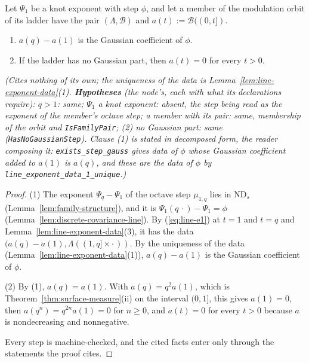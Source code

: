 \begin{lemma}
\label{lem:member-gaussian-part}
\leanok
{}
Let $\Psi_1$ be a knot exponent with step $\phi$, and let a member of the modulation orbit of its
ladder have the pair $(\Lambda, \mathcal{B})$ and $a(t) := \mathcal{B}((0,t])$.
\begin{enumerate}
\item $a(q) - a(1)$ is the Gaussian coefficient of $\phi$.
\item If the ladder has no Gaussian part, then $a(t) = 0$ for every $t > 0$.
\end{enumerate}
\statusT\quad\emph{(Cites nothing of its own; the uniqueness of the data is
Lemma~\ref{lem:line-exponent-data}(1). \textbf{Hypotheses} (the node's, each with what its
declarations require): $q > 1$: same; $\Psi_1$ a knot exponent: absent, the step being read as the
exponent of the member's octave step; a member with its pair: same, membership of the orbit and
\texttt{IsFamilyPair}; (2) no Gaussian part: same (\texttt{HasNoGaussianStep}). Clause (1) is
stated in decomposed form, the reader composing it: \texttt{exists\_step\_gauss} gives data of
$\phi$ whose Gaussian coefficient added to $a(1)$ is $a(q)$, and these are the data of $\phi$ by
\texttt{line\_exponent\_data\_1\_unique}.)}
\end{lemma}

\begin{proof}
\leanok
{}
(1) The exponent $\Psi_q - \Psi_1$ of the octave step $\mu_{1,q}$ lies in $\mathrm{ND}_s$
(Lemma~\ref{lem:family-structure}), and it is $\Psi_1(q\,\cdot) - \Psi_1 = \phi$
(Lemma~\ref{lem:discrete-covariance-line}). By (\ref{eq:line-e1}) at $t = 1$ and $t = q$ and
Lemma~\ref{lem:line-exponent-data}(3), it has the data $(a(q) - a(1), \Lambda((1,q] \times \cdot\,))$.
By the uniqueness of the data (Lemma~\ref{lem:line-exponent-data}(1)), $a(q) - a(1)$ is the
Gaussian coefficient of $\phi$.

(2) By (1), $a(q) = a(1)$. With $a(q) = q^2a(1)$, which is Theorem~\ref{thm:surface-measure}(ii)
on the interval $(0,1]$, this gives $a(1) = 0$, then $a(q^n) = q^{2n}a(1) = 0$ for $n \ge 0$, and
$a(t) = 0$ for every $t > 0$ because $a$ is nondecreasing and nonnegative.

Every step is machine-checked, and the cited facts enter only through the statements the proof
cites.
\end{proof}

